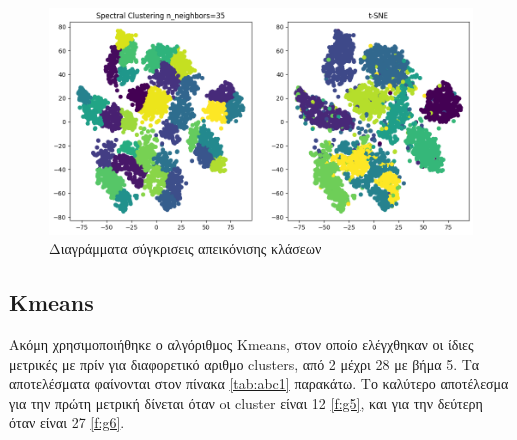 \begin{figure}[ht]
	\centering
	\includegraphics[width=1\linewidth]{Imagedata1/n_35tsne.png}
	\caption{ Διαγράμματα σύγκρισεις απεικόνισης κλάσεων }
	\label{f:g4}	
\end{figure}
\subsection{Kmeans}
Ακόμη χρησιμοποιήθηκε ο αλγόριθμος Kmeans, στον οποίο ελέγχθηκαν οι ίδιες μετρικές με πρίν για διαφορετικό αριθμο clusters, από 2 μέχρι 28 με βήμα 5. Τα αποτελέσματα φαίνονται στον πίνακα \ref{tab:abc1} παρακάτω. Το καλύτερο αποτέλεσμα για την πρώτη μετρική δίνεται όταν oι cluster είναι 12 \ref{f:g5}, και για την δεύτερη όταν είναι 27 \ref{f:g6}.

